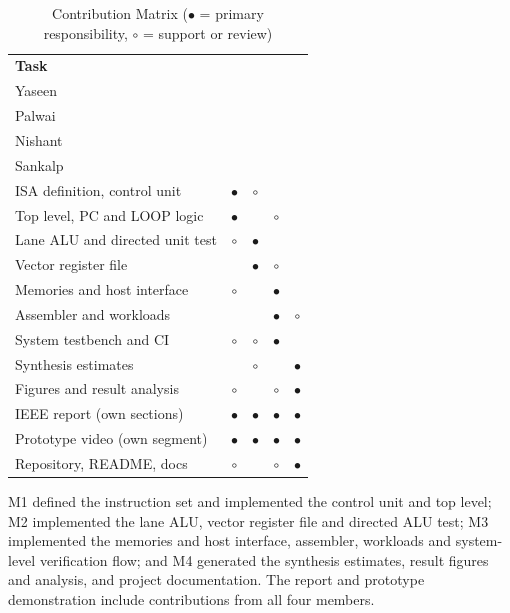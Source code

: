 \documentclass[conference]{IEEEtran}
\begin{document}
\begin{table}[H]
\caption{Contribution Matrix ($\bullet$ = primary responsibility, $\circ$ = support or review)}
\label{tab:matrix}
\centering
\scriptsize
\renewcommand{\arraystretch}{1.12}
\setlength{\tabcolsep}{3.5pt}
\begin{tabular}{@{}p{3.55cm} c c c c@{}}
\toprule
\textbf{Task} & \shortstack{\textbf{M1}\\Yaseen} & \shortstack{\textbf{M2}\\Palwai} & \shortstack{\textbf{M3}\\Nishant} & \shortstack{\textbf{M4}\\Sankalp}\\
\midrule
ISA definition, control unit              & $\bullet$ & $\circ$   &           &           \\
Top level, PC and LOOP logic              & $\bullet$ &           & $\circ$   &           \\
Lane ALU and directed unit test           & $\circ$   & $\bullet$ &           &           \\
Vector register file                      &           & $\bullet$ & $\circ$   &           \\
Memories and host interface               & $\circ$   &           & $\bullet$ &           \\
Assembler and workloads                   &           &           & $\bullet$ & $\circ$   \\
System testbench and CI        & $\circ$   & $\circ$   & $\bullet$ &           \\
Synthesis estimates                       &           & $\circ$   &           & $\bullet$ \\
Figures and result analysis                & $\circ$   &           & $\circ$   & $\bullet$ \\
IEEE report (own sections)                 & $\bullet$ & $\bullet$ & $\bullet$ & $\bullet$ \\
Prototype video (own segment)              & $\bullet$ & $\bullet$ & $\bullet$ & $\bullet$ \\
Repository, README, docs                   & $\circ$   &           & $\circ$   & $\bullet$ \\
\bottomrule
\end{tabular}
\end{table}

M1 defined the instruction set and implemented the control unit and top level; M2 implemented the lane ALU, vector register file and directed ALU test; M3 implemented the memories and host interface, assembler, workloads and system-level verification flow; and M4 generated the synthesis estimates, result figures and analysis, and project documentation. The report and prototype demonstration include contributions from all four members.
\end{document}

